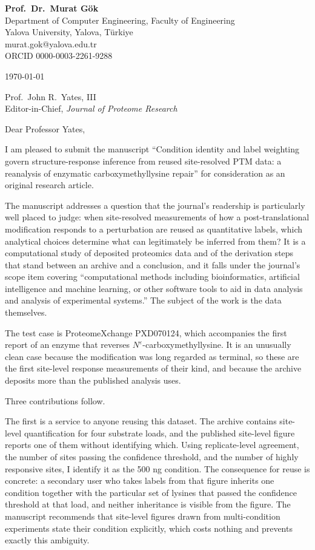 \documentclass[11pt,a4paper]{letter}
\begin{document}
\noindent\textbf{Prof.\ Dr.\ Murat Gök}\\
Department of Computer Engineering, Faculty of Engineering\\
Yalova University, Yalova, Türkiye\\
murat.gok@yalova.edu.tr\\
ORCID 0000-0003-2261-9288

\vspace{1.2em}
\noindent\today

\vspace{1.2em}
\noindent Prof.\ John R.\ Yates, III\\
Editor-in-Chief, \emph{Journal of Proteome Research}

\vspace{1.2em}
\noindent Dear Professor Yates,

I am pleased to submit the manuscript ``Condition identity and label weighting govern structure-response inference from reused site-resolved PTM data: a reanalysis of enzymatic carboxymethyllysine repair'' for consideration as an original research article.

The manuscript addresses a question that the journal's readership is particularly well placed to judge: when site-resolved measurements of how a post-translational modification responds to a perturbation are reused as quantitative labels, which analytical choices determine what can legitimately be inferred from them? It is a computational study of deposited proteomics data and of the derivation steps that stand between an archive and a conclusion, and it falls under the journal's scope item covering ``computational methods including bioinformatics, artificial intelligence and machine learning, or other software tools to aid in data analysis and analysis of experimental systems.'' The subject of the work is the data themselves.

The test case is ProteomeXchange PXD070124, which accompanies the first report of an enzyme that reverses $N^{\varepsilon}$-carboxymethyllysine. It is an unusually clean case because the modification was long regarded as terminal, so these are the first site-level response measurements of their kind, and because the archive deposits more than the published analysis uses.

Three contributions follow.

The first is a service to anyone reusing this dataset. The archive contains site-level quantification for four substrate loads, and the published site-level figure reports one of them without identifying which. Using replicate-level agreement, the number of sites passing the confidence threshold, and the number of highly responsive sites, I identify it as the 500 ng condition. The consequence for reuse is concrete: a secondary user who takes labels from that figure inherits one condition together with the particular set of lysines that passed the confidence threshold at that load, and neither inheritance is visible from the figure. The manuscript recommends that site-level figures drawn from multi-condition experiments state their condition explicitly, which costs nothing and prevents exactly this ambiguity.
\end{document}
